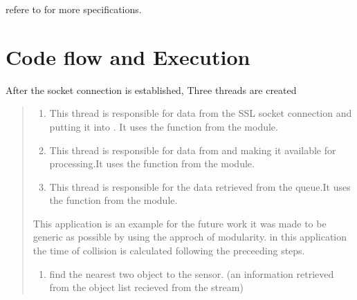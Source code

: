 \documentclass[letterpaper,10pt,english]{sphinxmanual}
\begin{document}
\sphinxAtStartPar
refere to   for more specifications.


\section{Code flow and Execution}
\label{\detokenize{projectdoc:code-flow-and-execution}}
\sphinxAtStartPar
After the socket connection is established, Three threads are created
\begin{quote}
\begin{enumerate}
%
\item {} \begin{description}
\sphinxAtStartPar
This thread is responsible for  data from the SSL socket connection and putting it into  . It uses the  function from the  module.

\end{description}

\item {} \begin{description}
\sphinxAtStartPar
This thread is responsible for  data from  and making it available for processing.It uses the  function from the  module.

\end{description}

\item {} \begin{description}
\sphinxAtStartPar
This thread is responsible for  the data retrieved from the queue.It uses the  function from the  module.

\end{description}

\end{enumerate}

\sphinxAtStartPar
This application is an example for the future work it was made to be generic as possible by using the approch of modularity.
in this application the time of collision is calculated following the preceeding steps.
\begin{enumerate}
%
\item {} 
\sphinxAtStartPar
find the nearest two object to the sensor. (an information retrieved from the object list recieved from the stream)


\end{enumerate}
\end{quote}
\end{document}
